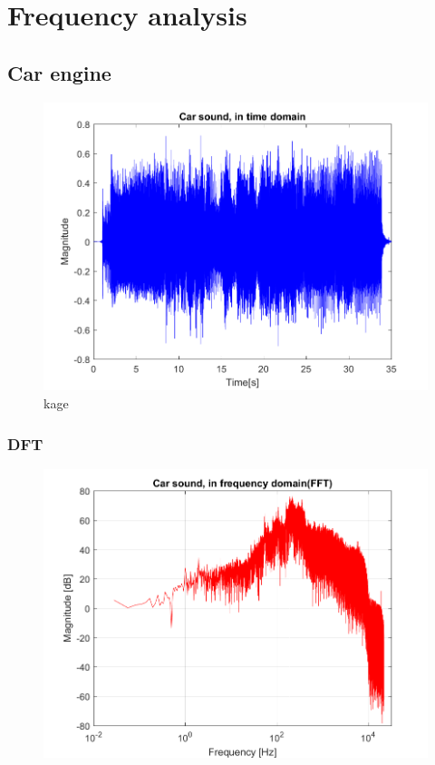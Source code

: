 





\section{Frequency analysis}
\label{sec:analysis}
\subsection{Car engine}

\begin{figure}
	\includegraphics[width=\textwidth]{code/Car_figure1.png}
	\caption{kage}
	\label{fig:Car_figure1:1}
\end{figure}

\subsubsection{DFT}
\begin{figure}
	\centering
	\includegraphics[width=\textwidth]{code/Car_figure2.png}
	\caption{}
	\label{fig:Car_figure2:2}
\end{figure}




